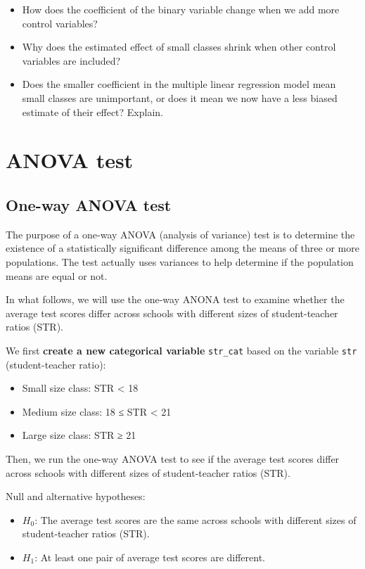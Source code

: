 \documentclass[
  12pt,
  letterpaper,
]{scrbook}
\providecommand{\tightlist}{%
  \setlength{\itemsep}{0pt}\setlength{\parskip}{0pt}}
\renewcommand{\tightlist}{\setlength{\itemsep}{0.5\baselineskip}\setlength{\parskip}{0.2\baselineskip}}
\theoremstyle{plain}
\theoremstyle{definition}
\theoremstyle{remark}
\begin{document}
\begin{itemize}
\tightlist
\item
  How does the coefficient of the binary variable change when we add
  more control variables?
\item
  Why does the estimated effect of small classes shrink when other
  control variables are included?
\item
  Does the smaller coefficient in the multiple linear regression model
  mean small classes are unimportant, or does it mean we now have a less
  biased estimate of their effect? Explain.
\end{itemize}

\section{ANOVA test}\label{anova-test}

\subsection{One-way ANOVA test}\label{one-way-anova-test}

The purpose of a one-way ANOVA (analysis of variance) test is to
determine the existence of a statistically significant difference among
the means of three or more populations. The test actually uses variances
to help determine if the population means are equal or not.

In what follows, we will use the one-way ANONA test to examine whether
the average test scores differ across schools with different sizes of
student-teacher ratios (STR).

We first \textbf{create a new categorical variable} \texttt{str\_cat}
based on the variable \texttt{str} (student-teacher ratio):

\begin{itemize}
\tightlist
\item
  Small size class: STR \textless{} 18
\item
  Medium size class: 18 ≤ STR \textless{} 21
\item
  Large size class: STR ≥ 21
\end{itemize}

Then, we run the one-way ANOVA test to see if the average test scores
differ across schools with different sizes of student-teacher ratios
(STR).

Null and alternative hypotheses:

\begin{itemize}
\tightlist
\item
  \(H_0\): The average test scores are the same across schools with
  different sizes of student-teacher ratios (STR).
\item
  \(H_1\): At least one pair of average test scores are different.
\end{itemize}
\end{document}
